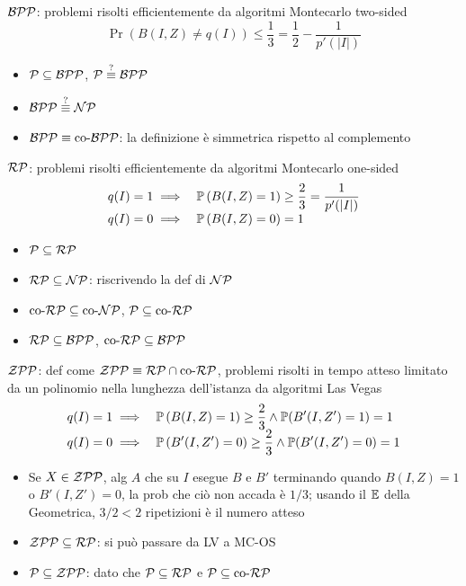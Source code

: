 $\BPP$: problemi risolti efficientemente da algoritmi Montecarlo two-sided
$$ \Pr \left(B (I,Z) \neq q(I)\right) \leq \frac{1}{3} = \frac{1}{2} - \frac{1}{p'(|I|)} $$
\begin{itemize}
	\item $\P \subseteq \BPP$, $\P \stackrel{?}{\equiv} \BPP$

	\item $\BPP \stackrel{?}{\equiv} \NP$

	\item $\BPP \equiv \coBPP$: la definizione è simmetrica rispetto al complemento
\end{itemize}

$\RP$: problemi risolti efficientemente da algoritmi Montecarlo one-sided
$$
\begin{array}{r l}
	q(I) = 1 \implies & \displaystyle \Pr \left(B(I, Z) = 1\right) \geq \frac{2}{3} = \frac{1}{p'(|I|)} \\
	q(I) = 0 \implies & \displaystyle \Pr \left(B(I, Z) = 0 \right) = 1
\end{array}
$$
\begin{itemize}
	\item $\P \subseteq \RP$

	\item $\RP \subseteq \NP$: riscrivendo la def di $\NP$

	\item $\coRP \subseteq \coNP$, $\P \subseteq \coRP$

	\item $\RP \subseteq \BPP$, $\coRP \subseteq \BPP$
\end{itemize}

$\ZPP$: def come $\ZPP \equiv \RP \cap \coRP$, problemi risolti in tempo atteso limitato da un polinomio nella lunghezza dell'istanza da algoritmi Las Vegas
$$
\begin{array}{r l}
	q(I) = 1 \implies & \displaystyle \Pr \left(B(I, Z) = 1\right) \geq \frac{2}{3} \wedge \Pr (B' (I, Z') = 1) = 1 \\
	q(I) = 0 \implies & \displaystyle \Pr \left(B'(I, Z') = 0\right) \geq \frac{2}{3} \wedge \Pr (B' (I, Z') = 0) = 1
\end{array}
$$
\begin{itemize}
	\item Se $X \in \ZPP$, alg $A$ che su $I$ esegue $B$ e $B'$ terminando quando $B(I, Z) = 1$ o $B'(I, Z') = 0$, la prob che ciò non accada è $1/3$; usando il $\Ex$ della Geometrica, $3/2 < 2$ ripetizioni è il numero atteso

	\item $\ZPP \subseteq \RP$: si può passare da LV a MC-OS

	\item $\P \subseteq \ZPP$: dato che $\P \subseteq \RP$ e $\P \subseteq \coRP$
\end{itemize}

